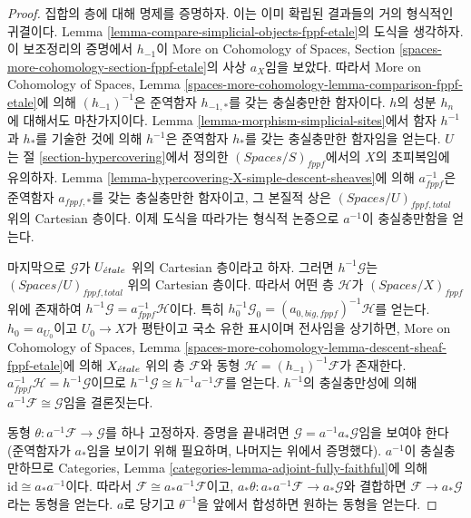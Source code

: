 \begin{proof}
집합의 층에 대해 명제를 증명하자. 이는 이미 확립된 결과들의
거의 형식적인 귀결이다.
Lemma \ref{lemma-compare-simplicial-objects-fppf-etale}의
도식을 생각하자. 이 보조정리의 증명에서
$h_{-1}$이 More on Cohomology of Spaces, Section
\ref{spaces-more-cohomology-section-fppf-etale}의 사상 $a_X$임을
보았다. 따라서
More on Cohomology of Spaces, Lemma
\ref{spaces-more-cohomology-lemma-comparison-fppf-etale}에 의해
$(h_{-1})^{-1}$은 준역함자 $h_{-1, *}$를 갖는 충실충만한 함자이다.
$h$의 성분 $h_n$에 대해서도 마찬가지이다.
Lemma \ref{lemma-morphism-simplicial-sites}에서
함자 $h^{-1}$과 $h_*$를 기술한 것에 의해
$h^{-1}$은 준역함자 $h_*$를 갖는 충실충만한 함자임을 얻는다.
$U$는 절 \ref{section-hypercovering}에서 정의한
$(\textit{Spaces}/S)_{fppf}$에서의 $X$의 초피복임에 유의하자.
Lemma \ref{lemma-hypercovering-X-simple-descent-sheaves}에 의해
$a_{fppf}^{-1}$은 준역함자 $a_{fppf, *}$를 갖는 충실충만한 함자이고,
그 본질적 상은 $(\textit{Spaces}/U)_{fppf, total}$ 위의
Cartesian 층이다. 이제 도식을 따라가는 형식적 논증으로
$a^{-1}$이 충실충만함을 얻는다.

\medskip\noindent
마지막으로 $\mathcal{G}$가 $U_{\acute{e}tale}$ 위의 Cartesian 층이라고 하자.
그러면 $h^{-1}\mathcal{G}$는
\newline
$(\textit{Spaces}/U)_{fppf, total}$\newline
위의 Cartesian 층이다. 따라서 어떤 층 $\mathcal{H}$가\newline
$(\textit{Spaces}/X)_{fppf}$ 위에 존재하여
\newline
$h^{-1}\mathcal{G} = a_{fppf}^{-1}\mathcal{H}$이다.
특히\newline
$h_0^{-1}\mathcal{G}_0 = (a_{0, big, fppf})^{-1}\mathcal{H}$를
얻는다. $h_0 = a_{U_0}$이고
$U_0 \to X$가 평탄이고 국소 유한 표시이며 전사임을 상기하면,
More on Cohomology of Spaces,
Lemma \ref{spaces-more-cohomology-lemma-descent-sheaf-fppf-etale}에 의해
$X_{\acute{e}tale}$ 위의 층 $\mathcal{F}$와 동형\newline
$\mathcal{H} = (h_{-1})^{-1}\mathcal{F}$가 존재한다.
$a_{fppf}^{-1}\mathcal{H} = h^{-1}\mathcal{G}$이므로\newline
$h^{-1}\mathcal{G} \cong h^{-1}a^{-1}\mathcal{F}$를 얻는다.
$h^{-1}$의 충실충만성에 의해
$a^{-1}\mathcal{F} \cong \mathcal{G}$임을 결론짓는다.

\medskip\noindent
동형 $\theta : a^{-1}\mathcal{F} \to \mathcal{G}$를 하나 고정하자.
증명을 끝내려면 $\mathcal{G} = a^{-1}a_*\mathcal{G}$임을 보여야 한다
(준역함자가 $a_*$임을 보이기 위해 필요하며, 나머지는 위에서 증명했다).
$a^{-1}$이 충실충만하므로
Categories, Lemma \ref{categories-lemma-adjoint-fully-faithful}에 의해
$\text{id} \cong a_*a^{-1}$이다.
따라서 $\mathcal{F} \cong a_*a^{-1}\mathcal{F}$이고,
$a_*\theta : a_*a^{-1}\mathcal{F} \to a_*\mathcal{G}$와 결합하면
$\mathcal{F} \to a_*\mathcal{G}$라는 동형을 얻는다.
$a$로 당기고 $\theta^{-1}$을 앞에서 합성하면 원하는 동형을 얻는다.
\end{proof}

